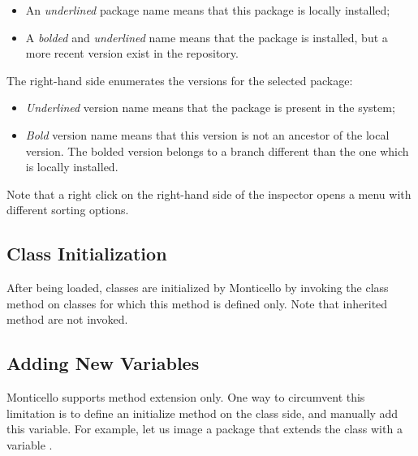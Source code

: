\documentclass[a4paper,10pt,twoside]{book}
\begin{document}
\begin{itemize}
\item An \emph{underlined} package name means that this package is locally installed;
\item A \emph{bolded} and \emph{underlined} name means that the package is installed, but a more recent version exist in the repository.
\end{itemize}

The right-hand side enumerates the versions for the selected package:

\begin{itemize}
\item \emph{Underlined} version name means that the package is present in the system;
\item \emph{Bold} version name means that this version is not an ancestor of the local version. The bolded version belongs to a branch different than the one which is locally installed.
\end{itemize}

Note that a right click on the right-hand side of the inspector opens a menu with different sorting options.


\subsection{Class Initialization}

After being loaded, classes are initialized by Monticello by invoking the  class method on classes for which this method is defined only. Note that inherited  method are not invoked. 

\subsection{Adding New Variables}

Monticello supports method extension only. One way to circumvent this limitation is to define an initialize method on the class side, and manually add this variable. For example, let us image a package that extends the class  with a variable .
\end{document}
